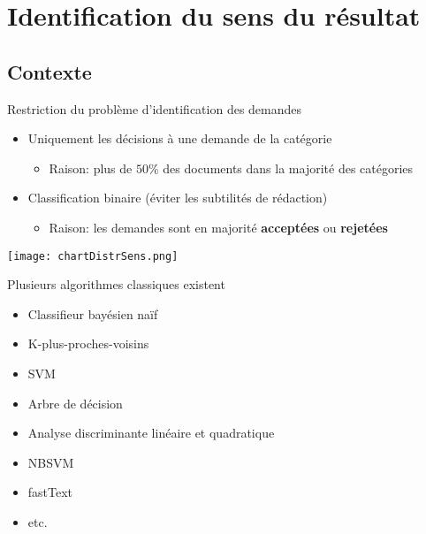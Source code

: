 \section{Identification du sens du résultat}


\subsection{Contexte}

\begin{frame}[t]{\mysubsectiontitle}
	Restriction du problème d'identification des demandes
\begin{itemize}	\small
	\item Uniquement les décisions à une demande de la catégorie
	\begin{itemize}\scriptsize
		\item Raison: plus de $50\%$ des documents dans la majorité des catégories
	\end{itemize}
	\item Classification binaire (éviter les subtilités de rédaction)
	\begin{itemize} \scriptsize
		\item Raison: les demandes sont en majorité \textbf{acceptées} ou \textbf{rejetées}
	\end{itemize}
\end{itemize}
\centering \texttt{[image: chartDistrSens.png]}
\end{frame}

\begin{frame}[t]{\mysubsectiontitle}
	Plusieurs algorithmes classiques existent
	\begin{itemize} \small
		\item Classifieur bayésien naïf \cite{duda1973patternclass} 
		\item K-plus-proches-voisins \cite{cover1967knn}
		\item SVM \cite{vapnik1995statlearning}
		\item Arbre de décision
		\item Analyse discriminante linéaire \cite{fisher1936linearDA} et quadratique \cite{McLachlan1992DiscrAnalyStatPattRecog-QDA}
		\item NBSVM \cite{wang2012nbsvm}
		\item fastText \cite{grave2017fasttextcls}
		\item etc.	
	\end{itemize}
\end{frame}


